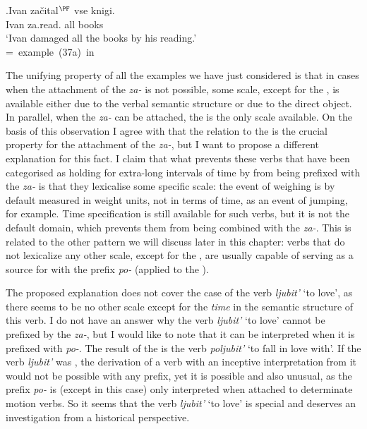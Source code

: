\exg.\label{ex:zachital}Ivan za\v{c}ital$^{\PF}$ vse knigi.\\
Ivan za.read. all books\\
`Ivan damaged all the books by his reading.'\\\hbox{}\hfill\hbox{= example (37a) in \citealt[246]{Braginsky:08}}

The unifying property of all the examples we have just considered is that in cases when the attachment of the  \textit{za-} is not possible, some scale, except for the , is available either due to the verbal semantic structure or due to the direct object. In parallel, when the  \textit{za-} can be attached, the  is the only scale available. On the basis of this observation I agree with \citet{Paducheva:96} that the relation to the  is the crucial property for the attachment of the  \textit{za-}, but I want to propose a different explanation for this fact. I claim that what prevents these verbs that have been categorised as holding for extra-long intervals of time by \citet{Paducheva:96} from being prefixed with the  \textit{za-} is that they lexicalise some specific scale: the event of weighing is by default measured in weight units, not in terms of time, as an event of jumping, for example. Time specification is still available for such verbs, but it is not the default domain, which prevents them from being combined with the  \textit{za-}. This is related to the other pattern we will discuss later in this chapter: verbs that do not lexicalize any other scale, except for the , are usually capable of serving as a source for  with the  prefix \textit{po-} (applied to the ). 

The proposed explanation does not cover the case of the verb \textit{ljubit'} `to love', as there seems to be no other scale except for the \textit{time} in the semantic structure of this verb. I do not have an answer why the verb \textit{ljubit'} `to love' cannot be prefixed by the  \textit{za-}, but I would like to note that it can be interpreted  when it is prefixed with \textit{po-}. The result of the  is the verb \textit{poljubit'} `to fall in love with'. If the verb \textit{ljubit'} was , the derivation of a verb with an inceptive interpretation from it would not be possible with any prefix, yet it is possible and also unusual, as the prefix \textit{po-} is (except in this case) only interpreted  when attached to determinate motion verbs. So it seems that the verb \textit{ljubit'} `to love' is special and deserves an investigation from a historical perspective. 

